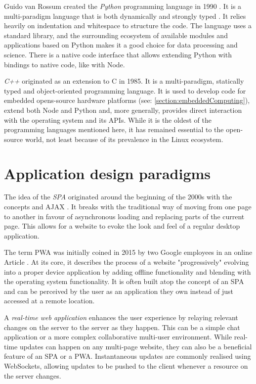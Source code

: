 Guido van Rossum created the \emph{Python} programming language in 1990 \parencite{pythonHistory}. It is a multi-paradigm language that is both dynamically and strongly typed \parencite{pythonTyping}. It relies heavily on indentation and whitespace to structure the code. The language uses a standard library, and the surrounding ecosystem of available modules and applications based on Python makes it a good choice for data processing and science. There is a native code interface that allows extending Python with bindings to native code, like with Node.

\emph{C++} originated as an extension to C in 1985. It is a multi-paradigm, statically typed and object-oriented programming language. It is used to develop code for embedded opens-source hardware platforms (see: \autoref{section:embeddedComputing}), extend both Node and Python and, more generally, provides direct interaction with the operating system and its APIs. While it is the oldest of the programming languages mentioned here, it has remained essential to the open-source world, not least because of its prevalence in the Linux ecosystem.


\section{Application design paradigms}

The idea of the \emph{\ac{SPA}} originated around the beginning of the 2000s with the concepts  \parencite{innerBrowsing} and \ac{AJAX} \parencite{ajaxNewApproach}. It breaks with the traditional way of moving from one page to another in favour of asynchronous loading and replacing parts of the current page. This allows for a website to evoke the look and feel of a regular desktop application.

The term \ac{PWA} was initially coined in 2015 by two Google employees in an online Article \parencite{progressiveWebApplications}. At its core, it describes the process of a website "progressively" evolving into a proper device application by adding offline functionality and blending with the operating system functionality. It is often built atop the concept of an \ac{SPA} and can be perceived by the user as an application they own instead of just accessed at a remote location.

A \emph{real-time web application} enhances the user experience by relaying relevant changes on the server to the server as they happen. This can be a simple chat application or a more complex collaborative multi-user environment. While real-time updates can happen on any multi-page website, they can also be a beneficial feature of an \ac{SPA} or a \ac{PWA}. Instantaneous updates are commonly realised using WebSockets, allowing updates to be pushed to the client whenever a resource on the server changes.


